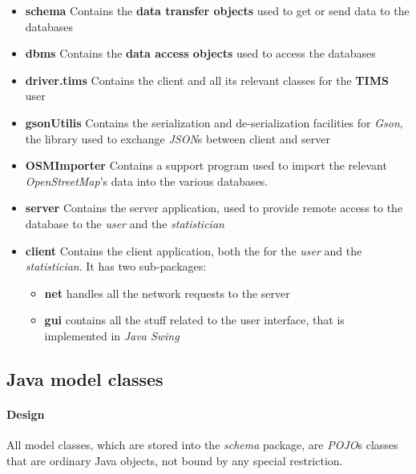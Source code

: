 \begin{itemize}
	\item \textbf{schema}
		Contains the \textbf{data transfer objects} used to get or send data to 
		the databases
	
	\item \textbf{dbms}
		Contains the \textbf{data access objects} used to access the databases
	
	\item \textbf{driver.tims}
		Contains the client and all its relevant classes for the \textbf{TIMS} 
		user
	
	\item \textbf{gsonUtilis}
		Contains the serialization and de-serialization facilities for 
		\textit{Gson}, the library used to exchange \textit{JSON}s between 
		client and server
	
	\item \textbf{OSMImporter}
		Contains a support program used to import the relevant 
		\textit{OpenStreetMap}'s data into the various databases.
	
	\item \textbf{server}
		Contains the server application, used to provide remote access to the 
		database to the \textit{user} and the \textit{statistician}
	
	\item \textbf{client}
		Contains the client application, both the for the \textit{user} and the 
		\textit{statistician}. It has two sub-packages:
		
		\begin{itemize}
			\item \textbf{net}
				handles all the network requests to the server
			
			\item \textbf{gui}
				contains all the stuff related to the user interface, that is 
				implemented in \textit{Java Swing} 
		\end{itemize}
\end{itemize}

\subsection{Java model classes}

\paragraph{Design}
All model classes, which are stored into the \textit{schema} package, are 
\textit{POJO}s classes that are ordinary Java objects, not bound by any special 
restriction.

